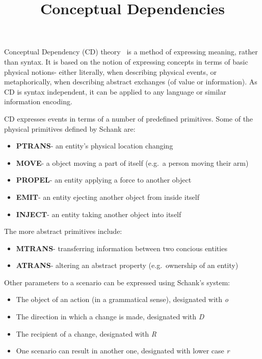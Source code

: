 \documentclass{article}
\title{Conceptual Dependencies}
\begin{document}
    \maketitle

    Conceptual Dependency (CD) theory~\cite{SCHANK1972552} is a method of expressing meaning, rather than syntax. It is based on the notion of expressing concepts in terms of basic physical notions- either literally, when describing physical events, or metaphorically, when describing abstract exchanges (of value or information). As CD is syntax independent, it can be applied to any language or similar information encoding.

    CD expresses events in terms of a number of predefined primitives. Some of the physical primitives defined by Schank are:
    \begin{itemize}
        \item \textbf{PTRANS}- an entity's physical location changing
        \item \textbf{MOVE}- a object moving a part of itself (e.g.~a person moving their arm)
        \item \textbf{PROPEL}- an entity applying a force to another object
        \item \textbf{EMIT}- an entity ejecting another object from inside itself
        \item \textbf{INJECT}- an entity taking another object into itself
    \end{itemize}

    The more abstract primitives include:
    \begin{itemize}
        \item \textbf{MTRANS}- transferring information between two concious entities
        \item \textbf{ATRANS}- altering an abstract property (e.g.~ownership of an entity)
    \end{itemize}

    Other parameters to a scenario can be expressed using Schank's system:
    \begin{itemize}
        \item The object of an action (in a grammatical sense), designated with \emph{o}
        \item The direction in which a change is made, designated with \emph{D}
        \item The recipient of a change, designated with \emph{R}
        \item One scenario can result in another one, designated with lower case \emph{r}
    \end{itemize}
\end{document}

